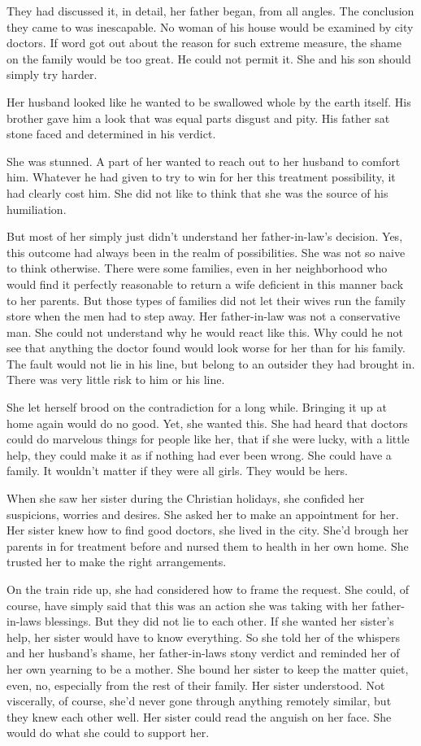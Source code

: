 \documentclass{article}
\begin{document}
They had discussed it, in detail, her father began, from all angles. The conclusion they came to was inescapable. No woman of his house would be examined by city doctors. If word got out about the reason for such extreme measure, the shame on the family would be too great. He could not permit it. She and his son should simply try harder.

Her husband looked like he wanted to be swallowed whole by the earth itself. His brother gave him a look that was equal parts disgust and pity. His father sat stone faced and determined in his verdict. 

She was stunned. A part of her wanted to reach out to her husband to comfort him. Whatever he had given to try to win for her this treatment possibility, it had clearly cost him. She did not like to think that she was the source of his humiliation. 

But most of her simply just didn't understand her father-in-law's decision. Yes, this outcome had always been in the realm of possibilities. She was not so naive to think otherwise. There were some families, even in her neighborhood who would find it perfectly reasonable to return a wife deficient in this manner back to her parents. But those types of families did not let their wives  run the family store when the men had to step away. Her father-in-law was not a conservative man. She could not understand why he would react like this. Why could he not see that anything the doctor found would look worse for her than for his family. The fault would not lie in his line, but belong to an outsider they had brought in. There was very little risk to him or his line.

She let herself brood on the contradiction for a long while. Bringing it up at home again would do no good. Yet, she wanted this. She had heard that doctors could do marvelous things for people like her, that if she were lucky, with a little help, they could make it as if nothing had ever been wrong. She could have a family. It wouldn't matter if they were all girls. They would be hers.

When she saw her sister during the Christian holidays, she confided her suspicions, worries and desires. She asked her to make an appointment for her. Her sister knew how to find good doctors, she lived in the city. She'd brough her parents in for treatment before and nursed them to health in her own home. She trusted her to make the right arrangements. 

On the train ride up, she had considered how to frame the request. She could, of course, have simply said that this was an action she was taking with her father-in-laws blessings. But they did not lie to each other. If she wanted her sister's help, her sister would have to know everything. So she told her of the whispers and her husband's shame, her father-in-laws stony verdict and reminded her of her own yearning to be a mother. She bound her sister to keep the matter quiet, even, no, especially from the rest of their family. Her sister understood. Not viscerally, of course, she'd never gone through anything remotely similar, but they knew each other well. Her sister could read the anguish on her face. She would do what she could to support her. 
\end{document}
